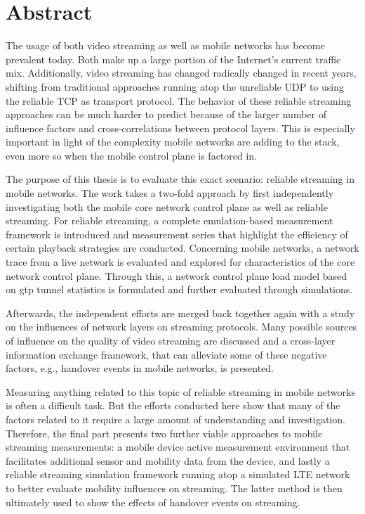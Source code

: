 \chapter*{Abstract}
%

The usage of both video streaming as well as mobile networks has become prevalent today. Both make up a large portion of the Internet's current traffic mix. Additionally, video streaming has changed radically changed in recent years, shifting from traditional approaches running atop the unreliable \acrshort{UDP} to using the reliable \acrshort{TCP} as transport protocol. The behavior of these reliable streaming approaches can be much harder to predict because of the larger number of influence factors and cross-correlations between protocol layers. This is especially important in light of the complexity mobile networks are adding to the stack, even more so when the mobile control plane is factored in.

The purpose of this thesis is to evaluate this exact scenario: reliable streaming in mobile networks. The work takes a two-fold approach by first independently investigating both the mobile core network control plane as well as reliable streaming. For reliable streaming, a complete emulation-based measurement framework is introduced and measurement series that highlight the efficiency of certain playback strategies are conducted. Concerning mobile networks, a network trace from a live network is evaluated and explored for characteristics of the core network control plane. Through this, a network control plane load model based on \acrshort{gtp} tunnel statistics is formulated and further evaluated through simulations.

Afterwards, the independent efforts are merged back together again with a study on the influences of network layers on streaming protocols. Many possible sources of influence on the quality of video streaming are discussed and a cross-layer information exchange framework, that can alleviate some of these negative factors, e.g., handover events in mobile networks, is presented. 

Measuring anything related to this topic of reliable streaming in mobile networks is often a difficult task. But the efforts conducted here show that many of the factors related to it require a large amount of understanding and investigation. Therefore, the final part presents two further viable approaches to mobile streaming measurements: a mobile device active measurement environment that facilitates additional sensor and mobility data from the device, and lastly a reliable streaming simulation framework running atop a simulated \acrshort{LTE} network to better evaluate mobility influences on streaming. The latter method is then ultimately used to show the effects of handover events on streaming. 

